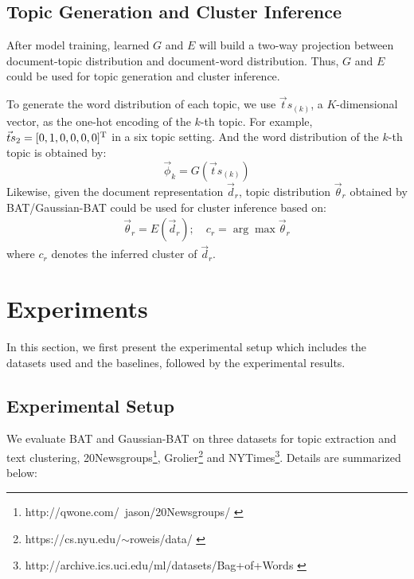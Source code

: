 \documentclass[11pt,a4paper]{article}
\begin{document}
\subsection{Topic Generation and Cluster Inference}

After model training, learned $G$ and $E$ will build a two-way projection between document-topic distribution and document-word distribution. Thus, $G$ and $E$ could be used for topic generation and cluster inference. 

To generate the word distribution of each topic, we use $\vec ts_{(k)}$, a $K$-dimensional vector, as the one-hot encoding of the $k$-th topic.  For example, $\vec ts_{2}=[0,1,0,0,0,0]^{\textrm T}$ in a six topic setting.  And the word distribution of the $k$-th topic is obtained by:
\begin{equation}
\vec \phi_{k}=G(\vec ts_{(k)})
\end{equation} 
Likewise,  given the document representation $\vec d_{r}$, topic distribution $\vec \theta_{r}$ obtained by BAT/Gaussian-BAT could be used for cluster inference based on:
\begin{align}
\vec \theta_{r}=E(\vec d_{r}); \quad 
c_{r}=\arg \max \vec\theta_{r}
\end{align}
where $c_{r}$ denotes the inferred cluster of $\vec d_{r}$.

\section{Experiments}

In this section, we first present the experimental setup which includes the datasets used and the baselines, followed by the experimental results. 




\subsection{Experimental Setup}

We evaluate BAT and Gaussian-BAT on three datasets  for topic extraction and text clustering, 20Newsgroups\footnote{http://qwone.com/~jason/20Newsgroups/ \label{20news}}, Grolier\footnote{https://cs.nyu.edu/$\sim$roweis/data/ \label{grolier}} and NYTimes\footnote{http://archive.ics.uci.edu/ml/datasets/Bag+of+Words \label{nytimes}}.  Details are summarized below:
\end{document}
